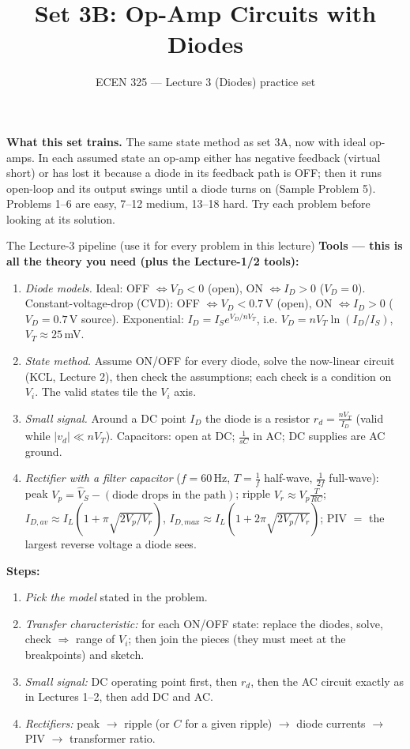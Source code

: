 \documentclass[11pt]{article}
\title{Set 3B: Op-Amp Circuits with Diodes}
\author{ECEN 325 --- Lecture 3 (Diodes) practice set}
\date{}
\begin{document}
\maketitle

\textbf{What this set trains.} The same state method as set 3A, now with ideal op-amps. In each assumed state an
op-amp either has negative feedback (virtual short) or has lost it because a diode in its feedback path is OFF; then
it runs open-loop and its output swings until a diode turns on (Sample Problem 5). Problems 1--6 are easy, 7--12
medium, 13--18 hard. Try each problem before looking at its solution.


\begin{cardbox}{The Lecture-3 pipeline (use it for every problem in this lecture)}
\textbf{Tools --- this is all the theory you need (plus the Lecture-1/2 tools):}
\begin{enumerate}[label=\textbf{T\arabic*},leftmargin=2.2em,itemsep=1pt]
\item \emph{Diode models.} Ideal: OFF $\Leftrightarrow V_D<0$ (open), ON $\Leftrightarrow I_D>0$ ($V_D=0$).
      Constant-voltage-drop (CVD): OFF $\Leftrightarrow V_D<0.7$\,V (open), ON $\Leftrightarrow I_D>0$ ($V_D=0.7$\,V source).
      Exponential: $I_D = I_S e^{V_D/nV_T}$, i.e. $V_D = nV_T\ln(I_D/I_S)$, $V_T\approx 25$\,mV.
\item \emph{State method.} Assume ON/OFF for every diode, solve the now-linear circuit (KCL, Lecture 2), then check
      the assumptions; each check is a condition on $V_i$. The valid states tile the $V_i$ axis.
\item \emph{Small signal.} Around a DC point $I_D$ the diode is a resistor $r_d = \frac{nV_T}{I_D}$
      (valid while $|v_d|\ll nV_T$). Capacitors: open at DC; $\frac{1}{sC}$ in AC; DC supplies are AC ground.
\item \emph{Rectifier with a filter capacitor} ($f=60$\,Hz, $T = \frac{1}{f}$ half-wave, $\frac{1}{2f}$ full-wave):
      peak $V_p=\hat V_S - (\text{diode drops in the path})$; ripple $V_r \approx V_p\frac{T}{RC}$;
      $I_{D,av} \approx I_L\left(1+\pi\sqrt{2V_p/V_r}\right)$, $I_{D,max}\approx I_L\left(1+2\pi\sqrt{2V_p/V_r}\right)$;
      PIV $=$ the largest reverse voltage a diode sees.
\end{enumerate}
\textbf{Steps:}
\begin{enumerate}[leftmargin=2.2em,itemsep=1pt]
\item \emph{Pick the model} stated in the problem.
\item \emph{Transfer characteristic:} for each ON/OFF state: replace the diodes, solve, check $\Rightarrow$ range of $V_i$;
      then join the pieces (they must meet at the breakpoints) and sketch.
\item \emph{Small signal:} DC operating point first, then $r_d$, then the AC circuit exactly as in Lectures 1--2,
      then add DC and AC.
\item \emph{Rectifiers:} peak $\to$ ripple (or $C$ for a given ripple) $\to$ diode currents $\to$ PIV $\to$ transformer ratio.
\end{enumerate}
\end{cardbox}
\end{document}

